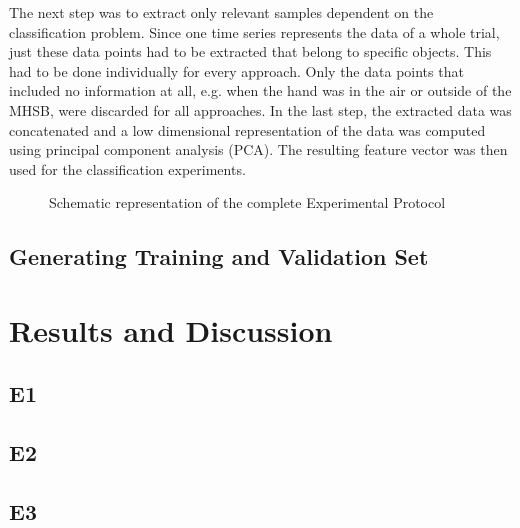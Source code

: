 The next step was to extract only relevant samples dependent on the classification problem. Since one time series represents the data of a whole trial, just these data points had to be extracted that belong to specific objects. This had to be done individually for every approach. Only the data points that included no information at all, e.g. when the hand was in the air or outside of the MHSB, were discarded for all approaches. 
In the last step, the extracted data was concatenated and a low dimensional representation of the data was computed using principal component analysis (PCA). The resulting feature vector was then used for the classification experiments. 

\begin{figure}[h]
	\caption{Schematic representation of the complete Experimental Protocol}
	\label{pipeline}
\end{figure}

\subsection{Generating Training and Validation Set}

\section{Results and Discussion}
\subsection{E1}
\subsection{E2}
\subsection{E3}